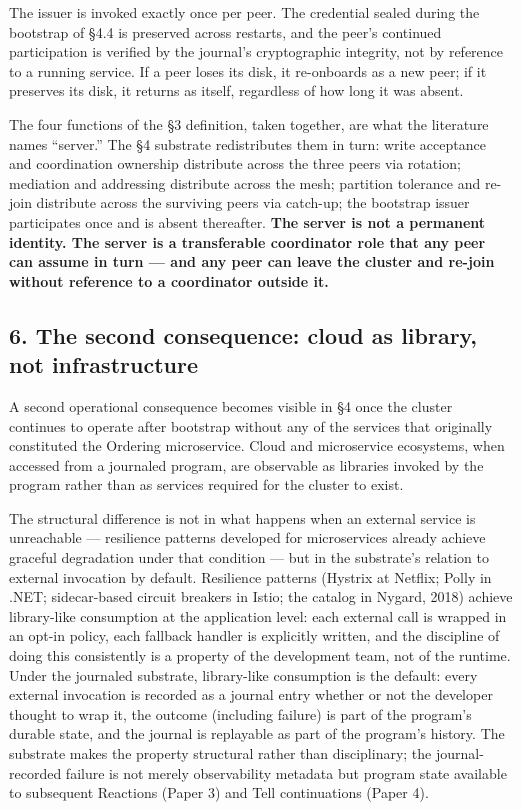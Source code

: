 \documentclass[
]{article}
\begin{document}
The issuer is invoked exactly once per peer. The credential sealed
during the bootstrap of §4.4 is preserved across restarts, and the
peer's continued participation is verified by the journal's
cryptographic integrity, not by reference to a running service. If a
peer loses its disk, it re-onboards as a new peer; if it preserves its
disk, it returns as itself, regardless of how long it was absent.

The four functions of the §3 definition, taken together, are what the
literature names ``server.'' The §4 substrate redistributes them in
turn: write acceptance and coordination ownership distribute across the
three peers via rotation; mediation and addressing distribute across the
mesh; partition tolerance and re-join distribute across the surviving
peers via catch-up; the bootstrap issuer participates once and is absent
thereafter. \textbf{The server is not a permanent identity. The server
is a transferable coordinator role that any peer can assume in turn ---
and any peer can leave the cluster and re-join without reference to a
coordinator outside it.}

\subsection{6. The second consequence: cloud as library, not
infrastructure}\label{the-second-consequence-cloud-as-library-not-infrastructure}

A second operational consequence becomes visible in §4 once the cluster
continues to operate after bootstrap without any of the services that
originally constituted the Ordering microservice. Cloud and microservice
ecosystems, when accessed from a journaled program, are observable as
libraries invoked by the program rather than as services required for
the cluster to exist.

The structural difference is not in what happens when an external
service is unreachable --- resilience patterns developed for
microservices already achieve graceful degradation under that condition
--- but in the substrate's relation to external invocation by default.
Resilience patterns (Hystrix at Netflix; Polly in .NET; sidecar-based
circuit breakers in Istio; the catalog in Nygard, 2018) achieve
library-like consumption at the application level: each external call is
wrapped in an opt-in policy, each fallback handler is explicitly
written, and the discipline of doing this consistently is a property of
the development team, not of the runtime. Under the journaled substrate,
library-like consumption is the default: every external invocation is
recorded as a journal entry whether or not the developer thought to wrap
it, the outcome (including failure) is part of the program's durable
state, and the journal is replayable as part of the program's history.
The substrate makes the property structural rather than disciplinary;
the journal-recorded failure is not merely observability metadata but
program state available to subsequent Reactions (Paper 3) and Tell
continuations (Paper 4).
\end{document}
